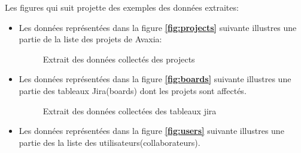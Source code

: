         \par Les figures qui suit projette des exemples des données extraites:
    \begin{itemize}
            
       \item  Les données représentées dans la figure \textbf{\ref{fig:projects}} suivante illustres une partie de la liste des projets de Avaxia:
        \begin{figure}[H]
             \begin{minipage}{1\linewidth}
                \centering
                \caption{Extrait des données collectés des projects}
                             \label{fig:projects}

            \end{minipage}\hfill 
            \begin{minipage}{1\linewidth}
                \centering
 
            \end{minipage}
             \label{fig:login}
        \end{figure}
        \newpage
        \item  Les données représentées dans la figure \textbf{\ref{fig:boards}} suivante illustres une partie des tableaux Jira(boards) dont les projets sont affectés.
        \begin{figure}[H]
            
             \begin{minipage}{1\linewidth}
                \centering
                \caption{Extrait des données collectées des tableaux jira}
                    \label{fig:boards}

            \end{minipage}\hfill 
            \begin{minipage}{1\linewidth}
                \centering
                
            \end{minipage}
             \label{fig:login}
        \end{figure}
        \item  Les données représentées dans la figure \textbf{\ref{fig:users}} suivante illustres une partie des la liste des utilisateurs(collaborateurs).
        \begin{figure}[H]
            

\end{figure}
\end{itemize}
